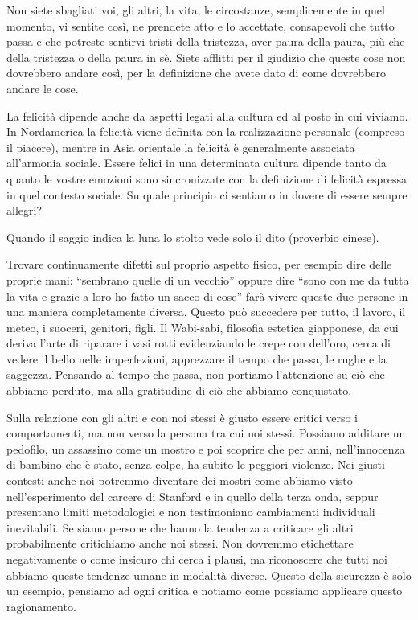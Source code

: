 \documentclass[12pt]{book} %
\begin{document}
Non siete sbagliati voi, gli altri, la vita, le circostanze, semplicemente in quel momento, vi sentite così, ne prendete
atto e lo accettate, consapevoli che tutto passa e che potreste sentirvi tristi della tristezza, aver paura della
paura, più che della tristezza o della paura in sè. Siete afflitti per il giudizio che queste cose non dovrebbero
andare così, per la definizione che avete dato di come dovrebbero andare le cose. 

La felicità dipende anche da aspetti legati alla cultura ed al posto in cui viviamo. In Nordamerica la felicità viene
definita con la realizzazione personale (compreso il piacere), mentre in Asia orientale la felicità è generalmente associata
all'armonia sociale. 
Essere felici in una determinata cultura dipende tanto da quanto le vostre emozioni sono sincronizzate con la
definizione di felicità espressa in quel contesto sociale. 
Su quale principio ci sentiamo in dovere di essere sempre allegri?

Quando il saggio indica la luna lo stolto vede solo il dito (proverbio cinese). 

Trovare continuamente difetti sul proprio aspetto fisico, per esempio dire delle proprie mani: “sembrano quelle di un
vecchio” oppure dire “sono con me da tutta la vita e grazie a loro ho fatto un sacco di cose” farà vivere queste due
persone in una maniera completamente diversa. Questo può succedere per tutto, il lavoro, il meteo, i suoceri, genitori,
figli. Il Wabi-sabi, filosofia estetica giapponese, da cui deriva l'arte di riparare i vasi rotti evidenziando le crepe con dell'oro,
cerca di vedere il bello nelle imperfezioni, apprezzare il tempo che passa, le
rughe e la saggezza. Pensando al tempo che passa, non portiamo l'attenzione su ciò che abbiamo perduto, ma alla gratitudine di ciò che abbiamo conquistato.

Sulla relazione con gli altri e con noi stessi è giusto essere critici verso i comportamenti, ma non verso la persona tra cui noi stessi. 
Possiamo additare un pedofilo, un assassino
come un mostro e poi scoprire che per anni, nell'innocenza di bambino che è stato, senza colpe, ha
subito le peggiori violenze. Nei giusti contesti anche noi potremmo diventare dei mostri come abbiamo visto
nell'esperimento del carcere di Stanford e in quello della terza onda, seppur presentano limiti metodologici e non testimoniano cambiamenti individuali inevitabili.
Se siamo persone che hanno la tendenza a criticare gli altri
probabilmente critichiamo anche noi stessi. Non dovremmo etichettare negativamente o come insicuro chi cerca i
plausi, ma riconoscere che tutti noi abbiamo queste tendenze umane in modalità diverse. Questo della sicurezza è solo
un esempio, pensiamo ad ogni critica e notiamo come possiamo applicare questo ragionamento.
\end{document}
